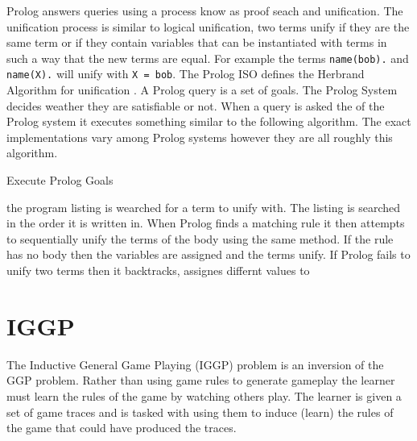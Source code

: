 Prolog answers queries using a process know as proof seach and unification. The unification process is similar to logical unification, two terms unify if they are the same term or if they contain variables that can be instantiated with terms in such a way that the new terms are equal. For example the terms \texttt{name(bob).} and \texttt{name(X).} will unify with \texttt{X = bob}. The Prolog ISO defines the Herbrand Algorithm for unification \cite{PrologISO}. A Prolog query is a set of goals. The Prolog System decides weather they are satisfiable or not. When a query is asked the of the Prolog system it executes something similar to the following algorithm. The exact implementations vary among Prolog systems however they are all roughly this algorithm.
\begin{algorithm}
\caption{Execute Prolog Goals}
\end{algorithm}

the program listing is wearched for a term to unify with. The listing is searched in the order it is written in. When Prolog finds a matching rule it then attempts to sequentially unify the terms of the body using the same method. If the rule has no body then the variables are assigned and the terms unify. If Prolog fails to unify two terms then it backtracks, assignes differnt values to \cite{Bratko}


\section{IGGP}
The Inductive General Game Playing (IGGP) problem is an inversion of the GGP problem. Rather than using game rules to generate gameplay the learner must learn the rules of the game by watching others play. The learner is given a set of game traces and is tasked with using them to induce (learn) the rules of the game that could have produced the traces\cite{Cropper/IGGP}.

